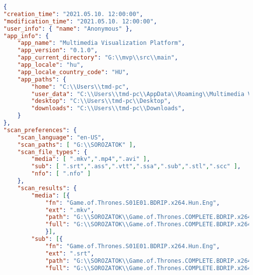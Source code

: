 \begin{lstlisting}[language={json}]
{
"creation_time": "2021.05.10. 12:00:00",
"modification_time": "2021.05.10. 12:00:00",
"user_info": { "name": "Anonymous" },
"app_info": {
    "app_name": "Multimedia Visualization Platform",
    "app_version": "0.1.0",
    "app_current_directory": "G:\\mvp\\src\\main",
    "app_locale": "hu",
    "app_locale_country_code": "HU",
    "app_paths": {
        "home": "C:\\Users\\tmd-pc",
        "user_data": "C:\\Users\\tmd-pc\\AppData\\Roaming\\Multimedia Visualization Platform",
        "desktop": "C:\\Users\\tmd-pc\\Desktop",
        "downloads": "C:\\Users\\tmd-pc\\Downloads",
    }
},
"scan_preferences": {
    "scan_language": "en-US",
    "scan_paths": [ "G:\\SOROZATOK" ],
    "scan_file_types": {
        "media": [ ".mkv",".mp4",".avi" ],
        "sub": [ ".srt",".ass",".vtt",".ssa",".sub",".stl",".scc" ],
        "nfo": [ ".nfo" ]
    },
    "scan_results": {
        "media": [{
            "fn": "Game.of.Thrones.S01E01.BDRIP.x264.Hun.Eng",
            "ext": ".mkv",
            "path": "G:\\SOROZATOK\\Game.of.Thrones.COMPLETE.BDRIP.x264.Hun.Eng",
            "full": "G:\\SOROZATOK\\Game.of.Thrones.COMPLETE.BDRIP.x264.Hun.Eng\\Game.of.Thrones.S01E01.BDRIP.x264.Hun.Eng.mkv"
            }],
        "sub": [{
            "fn": "Game.of.Thrones.S01E01.BDRIP.x264.Hun.Eng",
            "ext": ".srt",
            "path": "G:\\SOROZATOK\\Game.of.Thrones.COMPLETE.BDRIP.x264.Hun.Eng",
            "full": "G:\\SOROZATOK\\Game.of.Thrones.COMPLETE.BDRIP.x264.Hun.Eng\\Game.of.Thrones.S01E01.BDRIP.x264.Hun.Eng.srt"

\end{lstlisting}
